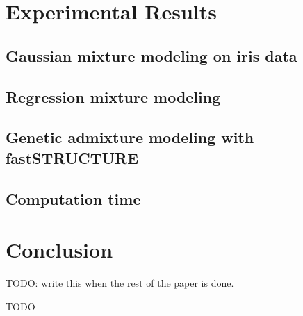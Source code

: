 \documentclass[ba]{imsart}
\begin{document}
\section{Experimental Results}


    \subsection{Gaussian mixture modeling on iris data}
    

    \subsection{Regression mixture modeling}
    

    \subsection{Genetic admixture modeling with fastSTRUCTURE}
    

    \subsection{Computation time}
    

\section{Conclusion}
TODO: write this when the rest of the paper is done.





\begin{acks}[Acknowledgments]
  TODO
\end{acks}
\end{document}
